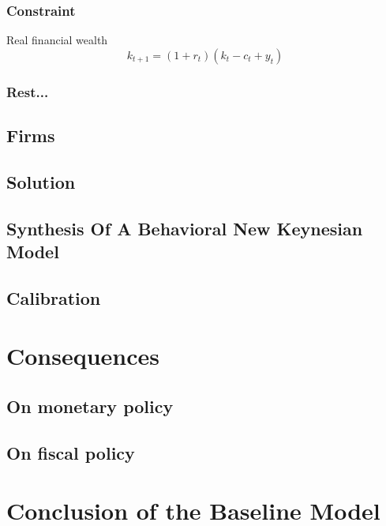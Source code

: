 \documentclass{beamer}
\begin{document}
\subsubsection{Constraint}
\begin{frame}{Real financial wealth}
    \begin{equation}
        \label{4}
        k_{t+1}=(1+r_t)(k_t-c_t+y_t)
    \end{equation}
\end{frame}

\subsubsection{Rest...}

\subsection{Firms}

\subsection{Solution}

\subsection{Synthesis Of A Behavioral New Keynesian Model}

\subsection{Calibration}

\section{Consequences}

\begin{frame}
\end{frame}

\subsection{On monetary policy}
\subsection{On fiscal policy}

\section{Conclusion of the Baseline Model}
\begin{frame}
\end{frame}
\end{document}
